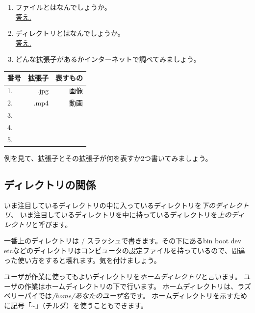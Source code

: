 \begin{tcolorbox}[title=\useOmetoi]
\begin{enumerate}
\item ファイルとはなんでしょうか。\\
\underline{答え.\hspace{0.8\linewidth}}
\item ディレクトリとはなんでしょうか。\\
\underline{答え.\hspace{0.8\linewidth}}
\item どんな拡張子があるかインターネットで調べてみましょう。
\end{enumerate}

\begin{table}[H]
  \centering
  \begin{tabular}{lrr} \toprule
番号 & 拡張子 & 表すもの \\ \midrule
1. & .jpg & 画像 \\
2. & .mp4 & 動画 \\
3. & \hspace{10\zw} & \hspace{10\zw} \\
4. & \hspace{10\zw} & \hspace{10\zw} \\
5. & \hspace{10\zw} & \hspace{10\zw} \\ \bottomrule
\end{tabular}
\end{table}
例を見て、拡張子とその拡張子が何を表すか2つ書いてみましょう。
\end{tcolorbox}

\subsection{ディレクトリの関係}
いま注目しているディレクトリの中に入っているディレクトリを\emph{下のディレクトリ}、
いま注目しているディレクトリを中に持っているディレクトリを\emph{上のディレクトリ}と呼びます。

一番上のディレクトリは / スラッシュで書きます。その下にあるbin boot dev etcなどのディレクトリはコンピュータの設定ファイルを持っているので、間違った使い方をすると壊れます。気を付けましょう。

ユーザが作業に使ってもよいディレクトリを\emph{ホームディレクトリ}と言います。
ユーザの作業はホームディレクトリの下で行います。
ホームディレクトリは、ラズベリーパイでは\emph{/home/あなたのユーザ名}です。
ホームディレクトリを示すために記号「\textasciitilde」（チルダ）を使うこともできます。

